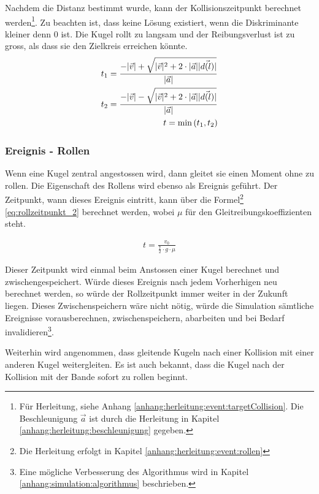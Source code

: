 Nachdem die Distanz bestimmt wurde, kann der Kollisionszeitpunkt berechnet werden\footnote{Für Herleitung, siehe Anhang \ref{anhang:herleitung:event:targetCollision}.
Die Beschleunigung $\vec{a}$ ist durch die Herleitung in Kapitel \ref{anhang:herleitung:beschleunigung} gegeben.}.
Zu beachten ist, dass keine Lösung existiert, wenn die Diskriminante kleiner denn $0$ ist. Die Kugel rollt zu langsam und
der Reibungsverlust ist zu gross, als dass sie den Zielkreis erreichen könnte.
\begin{align}
    t_1 = \frac{-\lvert \vec{v} \rvert + \sqrt{\lvert \vec{v} \rvert^2 + 2 \cdot \lvert \vec{a} \rvert \lvert \vec{d(l)} \rvert}}{\lvert \vec{a} \rvert}\\
    t_2 = \frac{-\lvert \vec{v} \rvert - \sqrt{\lvert \vec{v} \rvert^2 + 2 \cdot \lvert \vec{a} \rvert \lvert \vec{d(l)} \rvert}}{\lvert \vec{a} \rvert}\\
    t = \min{(t_1, t_2)}
\end{align}

\subsubsection{Ereignis - Rollen}
Wenn eine Kugel zentral angestossen wird, dann gleitet sie einen Moment ohne zu rollen. Die Eigenschaft des
Rollens wird ebenso als Ereignis geführt. Der Zeitpunkt, wann dieses Ereignis eintritt, kann über die
Formel\footnote{Die Herleitung erfolgt in Kapitel \ref{anhang:herleitung:event:rollen}} \ref{eq:rollzeitpunkt_2} berechnet
werden, wobei $\mu$ für den Gleitreibungskoeffizienten steht.

\begin{align}
    t = \frac{v_0}{\frac{7}{2} \cdot g \cdot \mu}\label{eq:rollzeitpunkt_2}
\end{align}

Dieser Zeitpunkt wird einmal beim Anstossen einer Kugel berechnet und zwischengespeichert. Würde dieses Ereignis nach
jedem Vorherhigen neu berechnet werden, so würde der Rollzeitpunkt immer weiter in der Zukunft liegen. Dieses Zwischenspeichern
wäre nicht nötig, würde die Simulation sämtliche Ereignisse vorausberechnen, zwischenspeichern, abarbeiten und bei Bedarf
invalidieren\footnote{Eine mögliche Verbesserung des Algorithmus wird in Kapitel \ref{anhang:simulation:algorithmus} beschrieben.}.

Weiterhin wird angenommen, dass gleitende Kugeln nach einer Kollision mit einer anderen Kugel weitergleiten. Es ist
auch bekannt, dass die Kugel nach der Kollision mit der Bande sofort zu rollen beginnt\cite{sciphysik:kugelohneschlupf}.

